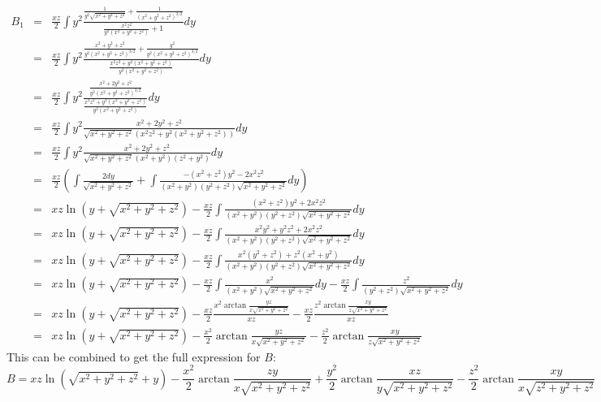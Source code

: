 \begin{eqnarray}
B_1 
&=& 
\frac{xz}{2} \int y^2 
\frac{\frac{1}{y^2\sqrt{x^2+y^2+z^2}}+\frac{1}{(x^2+y^2+z^2)^{3/2}}}{\frac{x^2z^2}{y^2(x^2+y^2+z^2)}+1} 
dy \nonumber\\
&=& 
\frac{xz}{2} \int y^2 
\frac{\frac{x^2+y^2+z^2}{y^2(x^2+y^2+z^2)^{3/2}}+\frac{y^2}{y^2(x^2+y^2+z^2)^{3/2}}}{\frac{x^2z^2+y^2(x^2+y^2+z^2)}{y^2(x^2+y^2+z^2)}} 
dy \nonumber\\
&=& 
\frac{xz}{2} \int y^2 
\frac{\frac{x^2+2y^2+z^2}{y^2(x^2+y^2+z^2)^{3/2}}}{\frac{x^2z^2+y^2(x^2+y^2+z^2)}{y^2(x^2+y^2+z^2)}} 
dy \nonumber\\
&=& 
\frac{xz}{2} \int y^2 
\frac{x^2+2y^2+z^2}{\sqrt{x^2+y^2+z^2}(x^2z^2+y^2(x^2+y^2+z^2))} 
dy \nonumber\\
&=& 
\frac{xz}{2} 
\int y^2 \frac{x^2+2y^2+z^2}{\sqrt{x^2+y^2+z^2}(x^2+y^2)(z^2+y^2)} 
dy \nonumber\\
&=& 
\frac{xz}{2} 
\left( 
\int \frac{2dy}{\sqrt{x^2+y^2+z^2}} + 
\int \frac{-(x^2+z^2)y^2-2x^2z^2}{(x^2+y^2)(y^2+z^2)\sqrt{x^2+y^2+z^2}} 
dy \right) \nonumber\\
&=& 
xz \ln{\left( y + \sqrt{x^2+y^2+z^2} \right)} - 
\frac{xz}{2} 
\int \frac{(x^2+z^2)y^2+2x^2z^2}{(x^2+y^2)(y^2+z^2)\sqrt{x^2+y^2+z^2}} 
dy \nonumber\\
&=& 
xz \ln{\left( y + \sqrt{x^2+y^2+z^2} \right)} - 
\frac{xz}{2} \int \frac{x^2y^2+y^2z^2+2x^2z^2}{(x^2+y^2)(y^2+z^2)\sqrt{x^2+y^2+z^2}} 
dy \nonumber\\
&=& 
xz \ln{\left( y + \sqrt{x^2+y^2+z^2} \right)} - 
\frac{xz}{2} \int \frac{x^2(y^2+z^2)+z^2(x^2+y^2)}{(x^2+y^2)(y^2+z^2)\sqrt{x^2+y^2+z^2}} 
dy \nonumber\\
&=& 
xz \ln{\left( y + \sqrt{x^2+y^2+z^2} \right)} - 
\frac{xz}{2} \int \frac{x^2}{(x^2+y^2)\sqrt{x^2+y^2+z^2}} dy - 
\frac{xz}{2} \int \frac{z^2}{(y^2+z^2)\sqrt{x^2+y^2+z^2}} 
dy \nonumber\\
&=& 
xz \ln{\left( y + \sqrt{x^2+y^2+z^2} \right)} - 
\frac{xz}{2} \frac{x^2\arctan{\frac{yz}{x\sqrt{x^2+y^2+z^2}}}}{xz} - 
\frac{xz}{2} \frac{z^2\arctan{\frac{xy}{z\sqrt{x^2+y^2+z^2}}}}{xz} 
\nonumber\\
&=& 
xz \ln{\left( y + \sqrt{x^2+y^2+z^2} \right)} - 
\frac{x^2}{2} \arctan{\frac{yz}{x\sqrt{x^2+y^2+z^2}}} - 
\frac{z^2}{2} \arctan{\frac{xy}{z\sqrt{x^2+y^2+z^2}}}
\end{eqnarray}
This can be combined to get the full expression for $B$:
\[
B = 
xz \ln{\left( \sqrt{x^2+y^2+z^2}+y \right)} - 
\frac{x^2}{2} \arctan{\frac{zy}{x\sqrt{x^2+y^2+z^2}}} + 
\frac{y^2}{2} \arctan{\frac{xz}{y\sqrt{x^2+y^2+z^2}}} - 
\frac{z^2}{2} \arctan{\frac{xy}{x\sqrt{z^2+y^2+z^2}}}
\]

